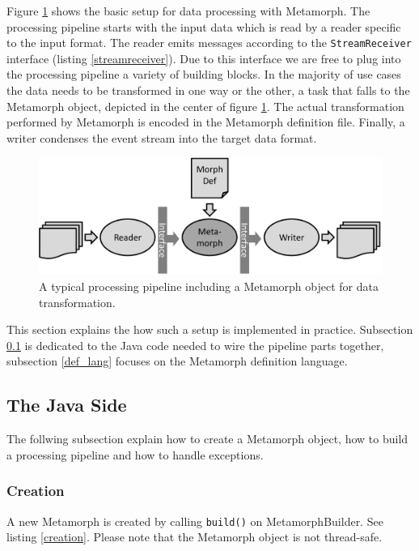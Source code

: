 \documentclass[12pt,a4paper]{article}
\begin{document}
Figure \ref{fig:readerwriter} shows the basic setup for data processing with Metamorph. The processing pipeline starts with the input data which is read by a reader specific to the input format. The reader emits messages according to the {\tt StreamReceiver} interface (listing \ref{streamreceiver}). Due to this interface we are free to plug into the processing pipeline a variety of building blocks. In the majority of use cases the data needs to be transformed in one way or the other, a task that falls to the Metamorph object, depicted in the center of figure  \ref{fig:readerwriter}. The actual transformation performed by Metamorph is encoded in the Metamorph definition file. Finally, a writer condenses the event stream into the target data format.

\begin{figure}[htp]
\centering
\includegraphics[width=.70\textwidth]{figures/readerwriter}
\caption{A typical processing pipeline including a Metamorph object for data transformation.}\label{fig:readerwriter}
\end{figure}


This section explains the how such a setup is implemented in practice. Subsection \ref{java} is dedicated to the Java code needed to wire the pipeline parts together, subsection \ref{def_lang} focuses on the Metamorph definition language. 


\subsection{The Java Side}\label{java}

The follwing subsection explain how to create a Metamorph object, how to build a processing pipeline and how to handle exceptions.

\subsubsection{Creation}

A new Metamorph is created by calling {\tt build()} on MetamorphBuilder. See listing \ref{creation}. Please note that the Metamorph object is not thread-safe. 
\end{document}

